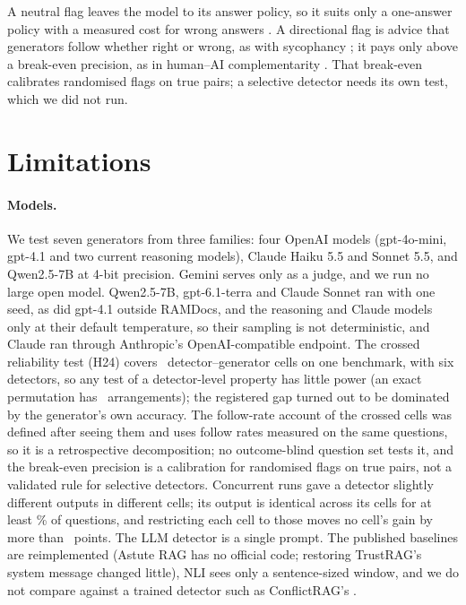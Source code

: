 A neutral flag leaves the model to its answer policy, so it suits only a one-answer policy with a measured cost for
wrong answers \citep{wen2025abstention}. A directional flag is advice that generators follow whether
right or wrong, as with sycophancy \citep{sharma2024sycophancy}; it pays only above a break-even precision, as in
human--AI complementarity \citep{bansal2021accurate,mozannar2020defer}. That break-even calibrates randomised flags on
true pairs; a selective detector needs its own test, which we did not run.
\section*{Limitations}

\paragraph{Models.} We test seven generators from three families: four OpenAI models (gpt-4o-mini, gpt-4.1 and two
current reasoning models), Claude Haiku 5.5 and Sonnet 5.5, and Qwen2.5-7B at 4-bit precision. Gemini serves only as a judge, and we run
no large open model. Qwen2.5-7B, gpt-6.1-terra and Claude Sonnet ran with one seed, as did gpt-4.1 outside RAMDocs, and the reasoning and Claude models
only at their default temperature, so their sampling is not deterministic, and Claude ran through Anthropic's
OpenAI-compatible endpoint. The crossed reliability test (H24) covers \hTwentyFourCells\ detector--generator cells on one benchmark, with six
detectors, so any test of a detector-level property has little power (an exact permutation has \hRedoNPerm\
arrangements); the registered gap turned out to be dominated by the generator's own accuracy. The follow-rate
account of the crossed cells was defined after seeing them and uses follow rates measured on the same questions, so it
is a retrospective decomposition; no outcome-blind question set tests it, and the break-even precision is a
calibration for randomised flags on true pairs, not a validated rule for selective detectors. Concurrent runs gave
a detector slightly different outputs in different cells; its output is identical across its cells for at least
\frozenShareMin\% of questions, and restricting each cell to those moves no cell's gain by more than \frozenMaxShift\
points. The LLM detector is a single
prompt. The published baselines are reimplemented (Astute RAG has no official code; restoring TrustRAG's system message
changed little), NLI sees only a sentence-sized window, and we do not compare
against a trained detector such as ConflictRAG's \citep{wang2026conflictrag}.

